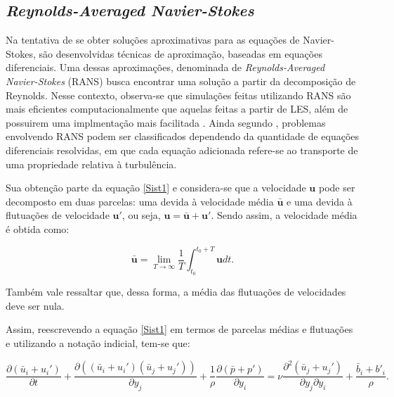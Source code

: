 \documentclass[_ArquivoPrincipal.tex]{subfiles}
\begin{document}
\subsection{\textit{Reynolds-Averaged Navier-Stokes}} \label{RANS}

Na tentativa de se obter soluções aproximativas para as equações de Navier-Stokes, são desenvolvidas técnicas de aproximação, baseadas em equações diferenciais. Uma dessas aproximações, denominada de \textit{Reynolds-Averaged Navier-Stokes} (RANS) busca encontrar uma solução a partir da decomposição de Reynolds. Nesse contexto, observa-se que simulações feitas utilizando RANS são mais eficientes computacionalmente que aquelas feitas a partir de LES, além de possuirem uma implmentação mais facilitada \cite{alfonsi2009reynolds, ling2015evaluation}. Ainda segundo , problemas envolvendo RANS podem ser classificados dependendo da quantidade de equações diferenciais resolvidas, em que cada equação adicionada refere-se ao transporte de uma propriedade relativa à turbulência.

Sua obtenção parte da equação \ref{Sist1} e considera-se que a velocidade $\mathbf{u}$ pode ser decomposto em duas parcelas: uma devida à velocidade média $\bar{\mathbf{u}}$ e uma devida à flutuações de velocidade $\mathbf{u}'$, ou seja, $\mathbf{u}=\bar{\mathbf{u}}+\mathbf{u}'$. Sendo assim, a velocidade média é obtida como:

\begin{equation}
    \bar{\mathbf{u}}=\lim_{T\to\infty}{\frac{1}{T}\int_{t_0}^{t_0+T}{\mathbf{u}dt}}\text{.}
    \label{umed}
\end{equation}

\noindent Também vale ressaltar que, dessa forma, a média das flutuações de velocidades deve ser nula.

Assim, reescrevendo a equação \ref{Sist1} em termos de parcelas médias e flutuações e utilizando a notação indicial, tem-se que:

\begin{equation}
    \frac{\partial(\bar{u}_i+u_i')}{\partial t}+\frac{\partial((\bar{u}_i+u_i')(\bar{u}_j+u_j'))}{\partial y_j}+\frac{1}{\rho}\frac{\partial(\bar{p}+p')}{\partial y_i}=\nu\frac{\partial^2(\bar{u}_j+u_j')}{\partial y_j\partial y_i}+\frac{\bar{b}_i+b'_i}{\rho}\text{.}
    \label{RANS1}
\end{equation}
\end{document}
